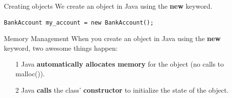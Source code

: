 \documentclass{beamer}
\begin{document}
\begin{frame}[fragile]{Creating objects}
We create an object in Java using the \textbf{new} keyword. \\
\vspace{0.5em}
\begin{Verbatim}
BankAccount my_account = new BankAccount();
\end{Verbatim}
\end{frame}



\begin{frame}[fragile]{Memory Management}
When you create an object in Java using the \textbf{new} keyword, two awesome things happen: \\
\begin{itemize}
\item[1] Java \textbf{automatically allocates memory} for the object (no calls to malloc()).
\item[2] Java \textbf{calls} the class' \textbf{constructor} to initialize the state of the object. \\
\end{itemize}
\end{frame}
\end{document}
